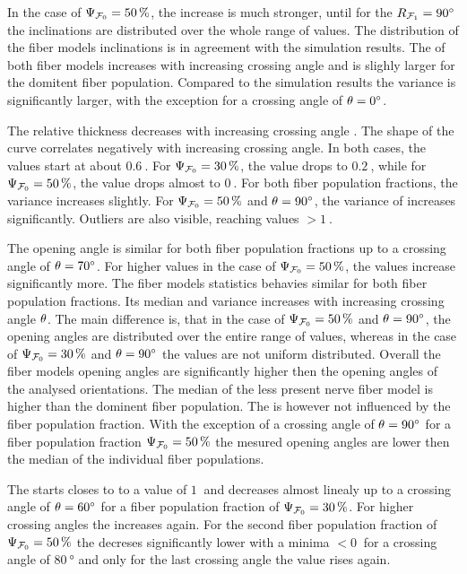 In the case of $\textnormal{$\Psi_{\textnormal{$\mathcal{F}_0$}}$} = \SI{50}{\percent}$, the increase is much stronger, until for the $\textnormal{$R_{\textnormal{$\mathcal{F}_1$}}$}=\SI{90}{\degree}$ the inclinations are distributed over the whole range of values.
The distribution of the fiber models inclinations is in agreement with the simulation results.
The \bvariance{} of both fiber models increases with increasing crossing angle and is slighly larger for the domitent fiber population.
Compared to the simulation results the \bvariance{} variance is significantly larger, with the exception for a crossing angle of $\textnormal{$\theta$}=\SI{0}{\degree}$.
\par
The relative thickness \trel{} decreases with increasing crossing angle \modelOmega{}.
The shape of the curve correlates negatively with increasing crossing angle.
In both cases, the \trel{} values start at about $\SI{0.6}{}$.
For $\textnormal{$\Psi_{\textnormal{$\mathcal{F}_0$}}$} = \SI{30}{\percent}$, the \trel{} value drops to $\SI{0.2}{}$, while for $\textnormal{$\Psi_{\textnormal{$\mathcal{F}_0$}}$} = \SI{50}{\percent}$, the \trel{} value drops almost to $\SI{0}{}$.
For both fiber population fractions, the variance increases slightly.
For $\textnormal{$\Psi_{\textnormal{$\mathcal{F}_0$}}$} = \SI{50}{\percent}$ and $\textnormal{$\theta$} = \SI{90}{\degree}$, the variance of \trel{} increases significantly.
Outliers are also visible, reaching \trel{} values $>\SI{1}{}$.
\par
The opening angle \openingAngle{} is similar for both fiber population fractions up to a crossing angle of $\textnormal{$\theta$}=\SI{70}{\degree}$.
For higher values in the case of $\textnormal{$\Psi_{\textnormal{$\mathcal{F}_0$}}$} = \SI{50}{\percent}$, the values increase significantly more.
The fiber models statistics behavies similar for both fiber population fractions.
Its median and \bvariance{} variance increases with increasing crossing angle $\textnormal{$\theta$}$.
The main difference is, that in the case of $\textnormal{$\Psi_{\textnormal{$\mathcal{F}_0$}}$} = \SI{50}{\percent}$ and $\textnormal{$\theta$} = \SI{90}{\degree}$, the opening angles are distributed over the entire range of values, whereas in the case of $\textnormal{$\Psi_{\textnormal{$\mathcal{F}_0$}}$} = \SI{30}{\percent}$ and $\textnormal{$\theta$} = \SI{90}{\degree}$ the values are not uniform distributed.
Overall the fiber models opening angles are significantly higher then the opening angles of the analysed orientations.
The median of the less present nerve fiber model is higher than the dominent fiber population.
The \bvariance{} is however not influenced by the fiber population fraction.
With the exception of a crossing angle of $\textnormal{$\theta$}=\SI{90}{\degree}$ for a fiber population fraction $\textnormal{$\Psi_{\textnormal{$\mathcal{F}_0$}}$}=\SI{50}{\percent}$ the mesured opening angles are lower then the median of the individual fiber populations.
% 
\par
The \accvalue{} starts closes to to a value of $\SI{1}{}$ and decreases almost linealy up to a crossing angle of $\textnormal{$\theta$} = \SI{60}{\degree}$ for a fiber population fraction of $\textnormal{$\Psi_{\textnormal{$\mathcal{F}_0$}}$} = \SI{30}{\percent}$.
For higher crossing angles the \accvalue{} increases again.
For the second fiber population fraction of $\textnormal{$\Psi_{\textnormal{$\mathcal{F}_0$}}$} = \SI{50}{\percent}$ the \accvalue{} decreses significantly lower with a minima $<\SI{0}{}$ for a crossing angle of $\SI{80}{\degree}$ and only for the last crossing angle the value rises again.
% 
% 
%
